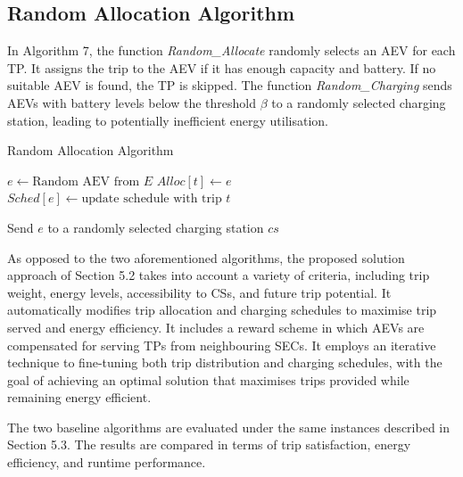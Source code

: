 \subsection{Random Allocation Algorithm}
  
In Algorithm 7, the function \textit{Random\_Allocate} randomly selects an AEV for each TP. It assigns the trip to the AEV if it has enough capacity and battery. If no suitable AEV is found, the TP is skipped.
The function \textit{Random\_Charging} sends AEVs with battery levels below the threshold  $\beta$ to a randomly selected charging station, leading to potentially inefficient energy utilisation.
\begin{algorithm}
\caption{Random Allocation Algorithm}
\begin{algorithmic}
     
        \State $e \gets \text{Random AEV from } E$ 
         
            \State $Alloc[t] \gets e$
            \State $Sched[e] \gets \text{update schedule with trip } t$
        \Else
            \State {}
        \EndIf
    \EndFor
\EndFunction

     
         
            \State Send $e$ to a randomly selected charging station $cs$
        \EndIf
    \EndFor
\EndFunction
\end{algorithmic}
\end{algorithm}

As opposed to the two aforementioned algorithms, the proposed solution approach of Section 5.2 takes into account a variety of criteria, including trip weight, energy levels, accessibility to CSs, and future trip potential. It automatically modifies trip allocation and charging schedules to maximise trip served and energy efficiency. It includes a reward scheme in which AEVs are compensated for serving TPs from neighbouring SECs. It employs an iterative technique to fine-tuning both trip distribution and charging schedules, with the goal of achieving an optimal solution that maximises trips provided while remaining energy efficient.

The two baseline algorithms are evaluated under the same instances described in Section 5.3. The results are compared in terms of trip satisfaction, energy efficiency, and runtime performance.

